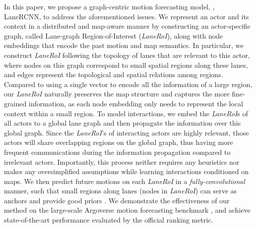 In this paper, we propose a graph-centric motion forecasting model, \ie, LaneRCNN, 
to address the aforementioned issues. 
We represent an actor and its context 
in a distributed and map-aware manner by 
constructing an actor-specific graph, called Lane-graph Region-of-Interest (\textit{LaneRoI}), along with node 
embeddings that encode the past motion and map semantics. 
In particular, we construct  \textit{LaneRoI} following the topology 
of lanes that are relevant to this actor, where nodes on this graph correspond
to small spatial regions along these lanes, and edges represent the topological and spatial relations among regions. 
Compared to using a single vector to encode all the information of a large region, our \textit{LaneRoI} naturally
preserves the map structure and captures the more fine-grained information, 
as each node embedding only needs to represent the local context within a small
region. 
To model interactions, we embed the \textit{LaneRoI}s of all actors to
a global lane graph  and then propagate the information over this global graph.
Since the \textit{LaneRoI}'s of interacting actors are highly relevant, those actors will
share overlapping regions on the global graph, thus having more frequent
communications during the information propagation compared to 
irrelevant actors. 
Importantly, this process neither requires any heuristics nor makes any oversimplified
assumptions while learning interactions conditioned on maps. 
We then predict future motions on each
\textit{LaneRoI} in a \emph{fully-convolutional} manner, such that small regions along
lanes (nodes in \textit{LaneRoI}) can serve as anchors and provide good priors
. We demonstrate the effectiveness of our method on the
large-scale Argoverse motion forecasting benchmark \cite{argoverse}, and
achieve state-of-the-art performance evaluated by the official ranking metric.
